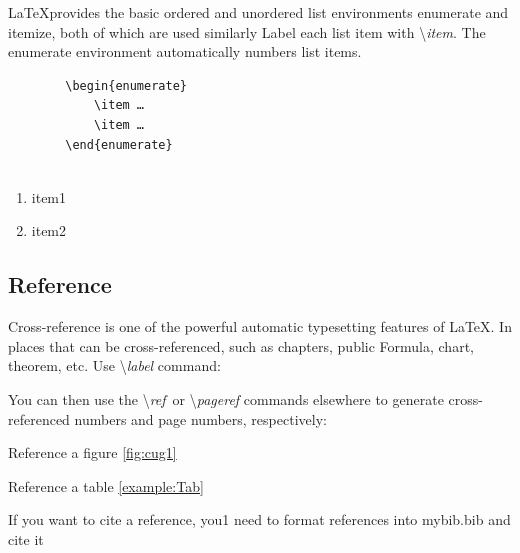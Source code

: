 \documentclass[twoside]{CUGCSthesis_EN}
\begin{document}
	\begin{table}[H]
		\centering
		\caption{Example:Tab}
		\label{example:Tab}
		\vspace{10mm}
	\end{table}

	\LaTeX provides the basic ordered and unordered list environments enumerate and itemize, both of which are used similarly 
	Label each list item with {\textbackslash}\textit{item}. The enumerate environment automatically numbers list items.

	\begin{verbatim}
		\begin{enumerate}
			\item …
			\item …
		\end{enumerate}
		
	\end{verbatim}

	\begin{enumerate}
		\item item1
		\item item2
	\end{enumerate}

	\subsection{Reference}

	Cross-reference is one of the powerful automatic typesetting features of \LaTeX. In places that can be cross-referenced, such as chapters, public 
	Formula, chart, theorem, etc. Use {\textbackslash}\textit{label} command:

	You can then use the {\textbackslash}\textit{ref}\ or {\textbackslash}\textit{pageref} commands elsewhere to generate cross-referenced numbers 
	and page numbers, respectively:

	Reference a figure \ref{fig:cug1}

	Reference a table \ref{example:Tab}

	If you want to cite a reference, you1 need to format references into mybib.bib and cite it \cite{1}
\end{document}
